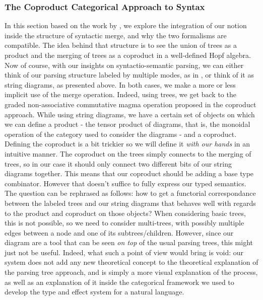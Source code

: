 \subsubsection{The Coproduct Categorical Approach to Syntax}
\label{subsubsec:coprod}
In this section based on the work by
,
we explore the integration of our notion inside the structure of syntactic
merge, and why the two formalisms are compatible.
The idea behind that structure is to see the union of trees as a product and
the merging of trees as a coproduct in a well-defined Hopf algebra.
Now of course, with our insights on syntactio-semantic parsing, we can either
think of our parsing structure labeled by multiple modes, as in
\cite{bumfordEffectdrivenInterpretationFunctors2025}, or think of it as string
diagrams, as presented above.
In both cases, we make a more or less implicit use of the merge operation.
Indeed, using trees, we get back to the graded non-associative commutative
magma operation proposed in the coproduct approach.
While using string diagrams, we have a certain set of objects on which we can
define a product - the tensor product of diagrams, that is, the monoidal
operation of the category used to consider the diagrams - and a coproduct.
Defining the coproduct is a bit trickier so we will define it \emph{with our
	hands} in an intuitive manner.
The coproduct on the trees simply connects to the merging of trees, so in our
case it should only connect two different bits of our string diagrams together.
This means that our coproduct should be adding a base type combinator.
However that doesn't suffice to fully express our typed semantics.
The question can be rephrased as follows: how to get a functorial
correspondance between the labeled trees and our string diagrams that behaves
well with regards to the product and coproduct on those objects?
When considering basic trees, this is not possible, so we need to consider
multi-trees, with possibly multiple edges between a node and one of its
subtrees/children.
However, since our diagram are a tool that can be seen \emph{on top} of the
usual parsing trees, this might just not be useful.
Indeed, what such a point of view would bring is void: our system does not
add any new theoretical concept to the theoretical explanation of the parsing
tree approach, and is simply a more visual explanation of the process, as well
as an explanation of it inside the categorical framework we used to develop the
type and effect system for a natural language.

